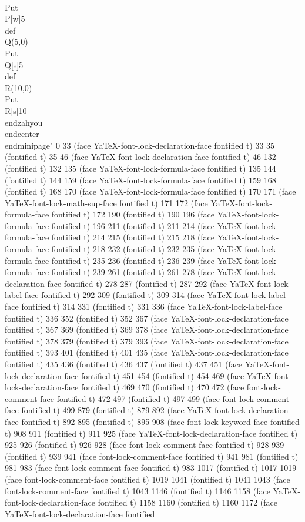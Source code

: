   \\Put\\P[w]{5}
   \\def\\Q{(5,0)}
   \\Put\\Q[s]{5}
   \\def\\R{(10,0)}
   \\Put\\R[s]{10}
  \\end{zahyou}
 \\end{center}
\\end{minipage}" 0 33 (face YaTeX-font-lock-declaration-face fontified t) 33 35 (fontified t) 35 46 (face YaTeX-font-lock-declaration-face fontified t) 46 132 (fontified t) 132 135 (face YaTeX-font-lock-formula-face fontified t) 135 144 (fontified t) 144 159 (face YaTeX-font-lock-formula-face fontified t) 159 168 (fontified t) 168 170 (face YaTeX-font-lock-formula-face fontified t) 170 171 (face YaTeX-font-lock-math-sup-face fontified t) 171 172 (face YaTeX-font-lock-formula-face fontified t) 172 190 (fontified t) 190 196 (face YaTeX-font-lock-formula-face fontified t) 196 211 (fontified t) 211 214 (face YaTeX-font-lock-formula-face fontified t) 214 215 (fontified t) 215 218 (face YaTeX-font-lock-formula-face fontified t) 218 232 (fontified t) 232 235 (face YaTeX-font-lock-formula-face fontified t) 235 236 (fontified t) 236 239 (face YaTeX-font-lock-formula-face fontified t) 239 261 (fontified t) 261 278 (face YaTeX-font-lock-declaration-face fontified t) 278 287 (fontified t) 287 292 (face YaTeX-font-lock-label-face fontified t) 292 309 (fontified t) 309 314 (face YaTeX-font-lock-label-face fontified t) 314 331 (fontified t) 331 336 (face YaTeX-font-lock-label-face fontified t) 336 352 (fontified t) 352 367 (face YaTeX-font-lock-declaration-face fontified t) 367 369 (fontified t) 369 378 (face YaTeX-font-lock-declaration-face fontified t) 378 379 (fontified t) 379 393 (face YaTeX-font-lock-declaration-face fontified t) 393 401 (fontified t) 401 435 (face YaTeX-font-lock-declaration-face fontified t) 435 436 (fontified t) 436 437 (fontified t) 437 451 (face YaTeX-font-lock-declaration-face fontified t) 451 454 (fontified t) 454 469 (face YaTeX-font-lock-declaration-face fontified t) 469 470 (fontified t) 470 472 (face font-lock-comment-face fontified t) 472 497 (fontified t) 497 499 (face font-lock-comment-face fontified t) 499 879 (fontified t) 879 892 (face YaTeX-font-lock-declaration-face fontified t) 892 895 (fontified t) 895 908 (face font-lock-keyword-face fontified t) 908 911 (fontified t) 911 925 (face YaTeX-font-lock-declaration-face fontified t) 925 926 (fontified t) 926 928 (face font-lock-comment-face fontified t) 928 939 (fontified t) 939 941 (face font-lock-comment-face fontified t) 941 981 (fontified t) 981 983 (face font-lock-comment-face fontified t) 983 1017 (fontified t) 1017 1019 (face font-lock-comment-face fontified t) 1019 1041 (fontified t) 1041 1043 (face font-lock-comment-face fontified t) 1043 1146 (fontified t) 1146 1158 (face YaTeX-font-lock-declaration-face fontified t) 1158 1160 (fontified t) 1160 1172 (face YaTeX-font-lock-declaration-face fontified 
